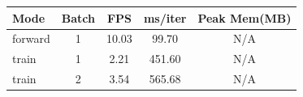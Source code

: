 \begin{tabular}{lcccc}
\toprule
Mode & Batch & FPS & ms/iter & Peak Mem(MB) \\
\midrule
forward & 1 & 10.03 & 99.70 & N/A \\
train & 1 & 2.21 & 451.60 & N/A \\
train & 2 & 3.54 & 565.68 & N/A \\
\bottomrule
\end{tabular}
